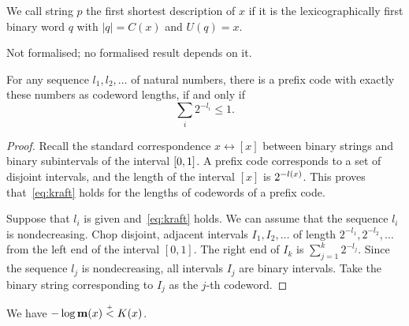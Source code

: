 \begin{definition}
  \label{def:first-shortest}
We call string \( p \) the first
shortest description of \( x \) if it is the lexicographically first
binary word \( q \) with \( |q| = C(x) \) and \( U(q)=x \). 
\end{definition}
\begin{formalization}
Not formalised; no formalised result depends on it.
\end{formalization}


 \begin{lemma}
  \leanok
\label{l:kraft} 
For any sequence \( l_{1},l_{2},\ldots \) of
natural numbers, there is a prefix code with exactly these numbers as
codeword lengths, if and only if
 \setcounter{equation}{8}%
 \begin{equation}	\sum_{i} 2^{-l_{i}} \le 1. \label{eq:kraft} 
 \end{equation}
 \end{lemma}

\begin{proof}
  \leanok
Recall the standard correspondence \( x \leftrightarrow [x] \) between
binary strings and binary subintervals of the interval \( [0,1] \).  
A prefix code corresponds to a set of disjoint intervals, and the 
length of the interval \( [x] \) is \( 2^{-l(x)} \). 
This proves 
that~\eqref{eq:kraft} holds for the lengths of codewords of a prefix code.

Suppose that \( l_{i} \) is given and~\eqref{eq:kraft} holds. 
We can assume that the sequence \( l_{i} \) is nondecreasing. 
Chop disjoint, adjacent 
intervals \( I_{1},I_{2},\ldots \) of length \( 2^{-l_{1}},2^{-l_{2}},\ldots \) from
the left end of the interval \( [0,1] \). 
The right end of \( I_{k} \) is \( \sum_{j=1}^k 2^{-l_{j}} \). 
Since 
the sequence \( l_{j} \) is nondecreasing, 
all intervals \( I_{j} \) are binary intervals. 
Take the binary string  corresponding to \( I_{j} \) as the \( j \)-th codeword. 
 \end{proof}

 \begin{corollary}
  \label{cor:m-le-K}
  \leanok
We have \( -\log \mathbf{m}(x) \stackrel{{}_+}{<} K(x) \).
 \end{corollary}

